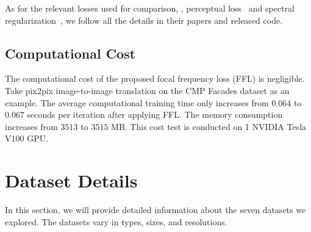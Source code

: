\documentclass[10pt,twocolumn,letterpaper]{article}
\begin{document}
\vspace{0.05cm}
As for the relevant losses used for comparison, \ie, perceptual loss~\cite{perceptualloss} and spectral regularization~\cite{specreg}, we follow all the details in their papers and released code.


\subsection{Computational Cost}
\label{sec:computationalcost}
The computational cost of the proposed focal frequency loss (FFL) is negligible. 
Take pix2pix image-to-image translation on the CMP Facades dataset as an example. The average computational training time only increases from $0.064$ to $0.067$ seconds per iteration after applying FFL.
The memory consumption increases from $3513$ to $3515$ MB.
This cost test is conducted on 1 NVIDIA Tesla V100 GPU.



\section{Dataset Details}
\label{sec:dataset}
In this section, we will provide detailed information about the seven datasets we explored. The datasets vary in types, sizes, and resolutions.
\end{document}
